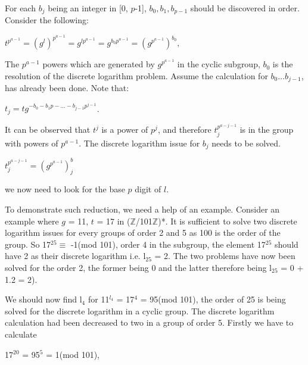 \documentclass[iwp,first]{luthesis}
\begin{document}
For each $b_j$ being an integer in [0, $p$-1], $b_0, b_1, b_{p-1}$ should be discovered in order. Consider the following:

\begin{center}

$t^{p^{a-1}} = (g^l)^{p^{a-1}} = g^{lp^{a-1}} = g^{b_{0}p^{a-1}} = (g^{p^{a-1}})^{b_0},$

\end{center}

The $p^{a-1}$ powers which are generated by $g^{p^{a-1}}$ in the cyclic subgroup, $b_0$ is the resolution of the discrete logarithm problem. Assume the calculation for $b_{0}…b_{j-1}$, has already been done. Note that:

 \begin{center}

$t_j = tg^{-b_{0}-b_{1}p-...-b_{j-1}p^{j-1}}$.

\end{center}

It can be observed that $t^j$ is a power of $p^j$, and therefore $t_j^{p^{a-j-1}}$ is in the group with powers of $p^{a-1}$. The discrete logarithm issue for $b_j$ needs to be solved. 

\begin{center}

$t_j^{p^{a-j-1}} = (g^{p^{a-1}})^b_j$

\end{center}

we now need to look for the base $p$ digit of $l$.

To demonstrate such reduction, we need a help of an example. Consider an example where $g$ = 11, $t$ = 17 in ($\mathbb{Z}$/101$\mathbb{Z}$)*.  It is sufficient to solve two discrete logarithm issues for every groups of order 2 and 5 as 100 is the order of the group. So 17$^{25} \equiv$ -1(mod 101), order 4 in the subgroup, the element 17$^{25}$ should have 2 as their discrete logarithm i.e. l$_{25}$ = 2. The two problems have now been solved for the order 2, the former being 0 and the latter therefore being l$_{25}$ = 0 + 1.2 = 2). 

We should now find l$_4$ for 11$^{l_4}$ = 17$^4$ = 95(mod 101), the order of 25 is being solved for the discrete logarithm in a cyclic group. The discrete logarithm calculation had been decreased to two in a group of order 5. Firstly we have to calculate 

\begin{center}
17$^20$ = 95$^5$ = 1(mod 101), 
\end{center}
\end{document}
